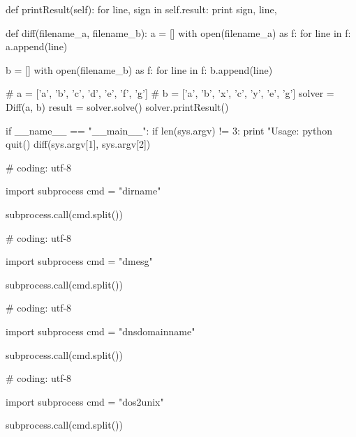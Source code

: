 \begin{mylisting}[label={lst:diff},language=sh,caption=diffコマンド]
  def printResult(self):
    for line, sign in self.result:
      print sign, line,

def diff(filename_a, filename_b):
  a = []
  with open(filename_a) as f:
    for line in f:
      a.append(line)

  b = []
  with open(filename_b) as f:
    for line in f:
      b.append(line)

  # a = ['a', 'b', 'c', 'd', 'e', 'f', 'g']
  # b = ['a', 'b', 'x', 'c', 'y', 'e', 'g']
  solver = Diff(a, b)
  result = solver.solve()
  solver.printResult()

if __name__ == "__main__":
  if len(sys.argv) != 3:
    print "Usage: python %
    quit()
  diff(sys.argv[1], sys.argv[2])
\end{mylisting}

\begin{mylisting}[label={lst:acpid},language=sh,caption=dirname]

# coding: utf-8

import subprocess
cmd = "dirname"

subprocess.call(cmd.split())

\end{mylisting}

\begin{mylisting}[label={lst:acpid},language=sh,caption=dmesg]

# coding: utf-8

import subprocess
cmd = "dmesg"

subprocess.call(cmd.split())

\end{mylisting}

\begin{mylisting}[label={lst:acpid},language=sh,caption=dnsdomainname]

# coding: utf-8

import subprocess
cmd = "dnsdomainname"

subprocess.call(cmd.split())

\end{mylisting}

\begin{mylisting}[label={lst:acpid},language=sh,caption=dos2unix]

# coding: utf-8

import subprocess
cmd = "dos2unix"

subprocess.call(cmd.split())

\end{mylisting}

